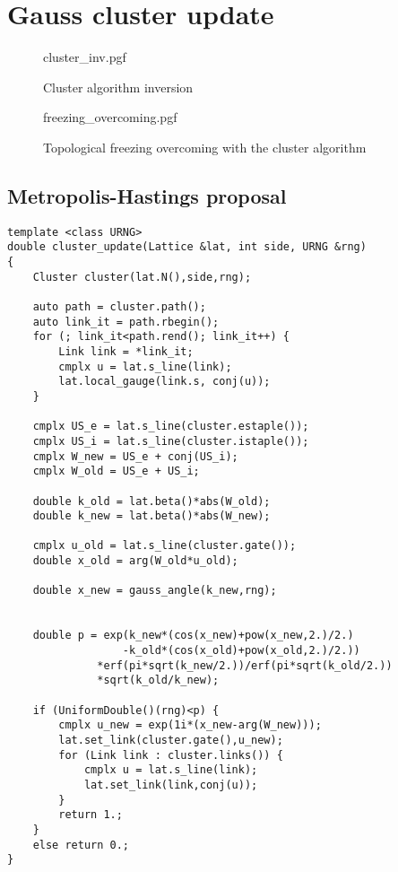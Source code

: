 \section{Gauss cluster update}

\begin{figure}[!htb]
    \centering
    {cluster_inv.pgf}
    \caption{Cluster algorithm inversion}
    \label{fig:cluster_inv}
\end{figure}

\begin{figure}[!htb]
    \centering
    {freezing_overcoming.pgf}
    \caption{Topological freezing overcoming with the cluster algorithm}
    \label{fig:freezing_overcoming}
\end{figure}


\subsection*{Metropolis-Hastings proposal}
\begin{lstlisting}[caption={Metropolis-Hastings cluster update}]
template <class URNG>
double cluster_update(Lattice &lat, int side, URNG &rng)
{
    Cluster cluster(lat.N(),side,rng);

    auto path = cluster.path();
    auto link_it = path.rbegin();
    for (; link_it<path.rend(); link_it++) {
        Link link = *link_it;
        cmplx u = lat.s_line(link);
        lat.local_gauge(link.s, conj(u));
    }
    
    cmplx US_e = lat.s_line(cluster.estaple());
    cmplx US_i = lat.s_line(cluster.istaple());
    cmplx W_new = US_e + conj(US_i);
    cmplx W_old = US_e + US_i;
    
    double k_old = lat.beta()*abs(W_old);
    double k_new = lat.beta()*abs(W_new);

    cmplx u_old = lat.s_line(cluster.gate());
    double x_old = arg(W_old*u_old);
    
    double x_new = gauss_angle(k_new,rng);
    

    double p = exp(k_new*(cos(x_new)+pow(x_new,2.)/2.)
                  -k_old*(cos(x_old)+pow(x_old,2.)/2.))
              *erf(pi*sqrt(k_new/2.))/erf(pi*sqrt(k_old/2.))
              *sqrt(k_old/k_new);
    
    if (UniformDouble()(rng)<p) {
        cmplx u_new = exp(1i*(x_new-arg(W_new)));
        lat.set_link(cluster.gate(),u_new);
        for (Link link : cluster.links()) {
            cmplx u = lat.s_line(link);
            lat.set_link(link,conj(u));
        }
        return 1.;
    }
    else return 0.;
}
\end{lstlisting}

